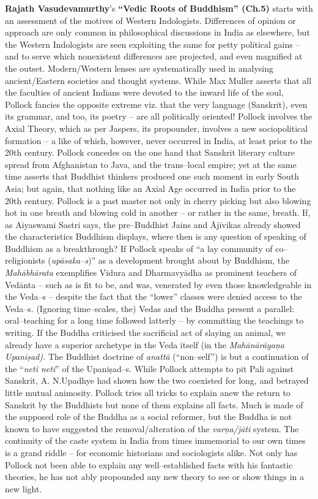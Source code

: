 \textbf{Rajath Vasudevamurthy}’s \textbf{“Vedic Roots of Buddhism” (Ch.5)} starts with an assessment of the motives of Western Indologists. Differences of opinion or approach are only common in philosophical discussions in India as elsewhere, but the Western Indologists are seen exploiting the same for petty political gains – and to serve which nonexistent differences are projected, and even magnified at the outset. Modern/Western lenses are systematically used in analysing ancient/Eastern societies and thought systems. While Max Muller asserts that all the faculties of ancient Indians were devoted to the inward life of the soul, Pollock fancies the opposite extreme viz. that the very language (Sanskrit), even its grammar, and too, its poetry – are all politically oriented! Pollock involves the Axial Theory, which as per Jaspers, its propounder, involves a new sociopolitical formation – a like of which, however, never occurred in India, at least prior to the 20th century. Pollock concedes on the one hand that Sanskrit literary culture spread from Afghanistan to Java, and the trans–local empire; yet at the same time asserts that Buddhist thinkers produced one such moment in early South Asia; but again, that nothing like an Axial Age occurred in India prior to the 20th century. Pollock is a past master not only in cherry picking but also blowing hot in one breath and blowing cold in another – or rather in the same, breath. If, as Aiyaswami Sastri says, the pre–Buddhist Jains and Ājīvikas already showed the characteristics Buddhism displays, where then is any question of speaking of Buddhism as a breakthrough? If Pollock speaks of “a lay community of co–religionists (\textit{upāsaka–s})” as a development brought about by Buddhism, the \textit{Mahābhārata} exemplifies Vidura and Dharmavyādha as prominent teachers of Vedānta – such as is fit to be, and was, venerated by even those knowledgeable in the Veda–s – despite the fact that the “lower” classes were denied access to the Veda–s. (Ignoring time–scales, the) Vedas and the Buddha present a parallel: oral–teaching for a long time followed latterly – by committing the teachings to writing. If the Buddha criticised the sacrificial act of slaying an animal, we already have a superior archetype in the Veda itself (in the \textit{Mahānārāyaṇa Upaniṣad).} The Buddhist doctrine of \textit{anattā} (“non–self”) is but a continuation of the “\textit{neti neti}” of the Upaniṣad–s. While Pollock attempts to pit Pali against Sanskrit, A. N.Upadhye had shown how the two coexisted for long, and betrayed little mutual animosity. Pollock tries all tricks to explain anew the return to Sanskrit by the Buddhists but none of them explains all facts. Much is made of the supposed role of the Buddha as a social reformer, but the Buddha is not known to have suggested the removal/alteration of the \textit{varṇa/jāti} system. The continuity of the caste system in India from times immemorial to our own times is a grand riddle – for economic historians and sociologists alike. Not only has Pollock not been able to explain any well–established facts with his fantastic theories, he has not ably propounded any new theory to see or show things in a new light.


